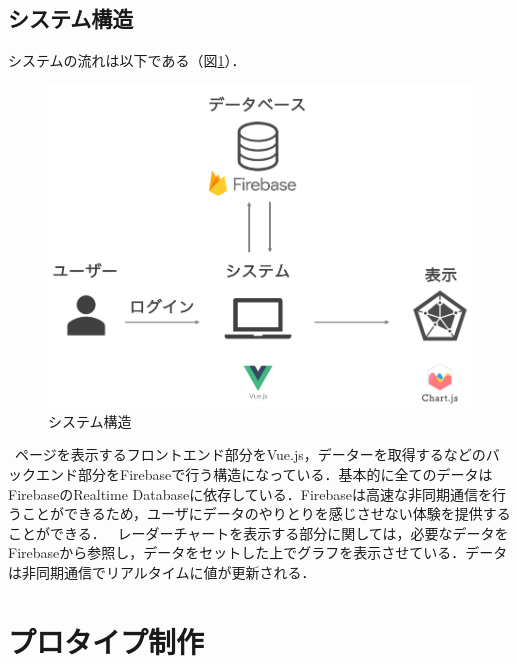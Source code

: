 \documentclass{funthesis}
\begin{document}
\subsection{システム構造}
システムの流れは以下である（図\ref{sysytem}）．\\
\begin{figure}[h]
 \centering
   \includegraphics[width=150mm]{figures/sysytemstrucuture.png}
 \caption{システム構造}
 \label{sysytem}
\end{figure}

\ ページを表示するフロントエンド部分をVue.js，データーを取得するなどのバックエンド部分をFirebaseで行う構造になっている．基本的に全てのデータはFirebaseのRealtime Databaseに依存している．Firebaseは高速な非同期通信を行うことができるため，ユーザにデータのやりとりを感じさせない体験を提供することができる．
\ レーダーチャートを表示する部分に関しては，必要なデータをFirebaseから参照し，データをセットした上でグラフを表示させている．データは非同期通信でリアルタイムに値が更新される．


\section{プロタイプ制作}
\end{document}
